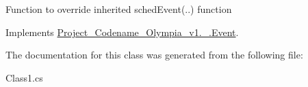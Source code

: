 Function to override inherited sched\+Event(..) function 

Implements \hyperlink{classProject__Codename__Olympia__v1_1_1__0_1_1Event_abb4e2b9c28527b9a28395f2fe9192196}{Project\+\_\+\+Codename\+\_\+\+Olympia\+\_\+v1.\+\_.\+Event}.



The documentation for this class was generated from the following file\+:\begin{DoxyCompactItemize}
\item 
Class1.\+cs\end{DoxyCompactItemize}
